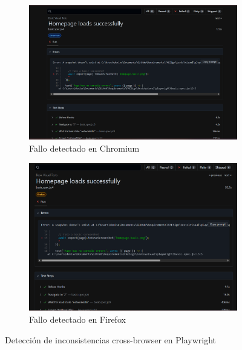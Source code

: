 \documentclass{article}
\begin{document}
\begin{figure}[H]
\begin{subfigure}{0.45\textwidth}
\centering
\includegraphics[width=\textwidth]{playwright/1fallo_chronium.png}
\caption{Fallo detectado en Chromium}
\label{fig:playwright-chromium-fail}
\end{subfigure}
\hfill
\begin{subfigure}{0.45\textwidth}
\centering
\includegraphics[width=\textwidth]{playwright/1fallo_firefox.png}
\caption{Fallo detectado en Firefox}
\label{fig:playwright-firefox-fail}
\end{subfigure}
\caption{Detección de inconsistencias cross-browser en Playwright}
\label{fig:playwright-failures}
\end{figure}
\end{document}
